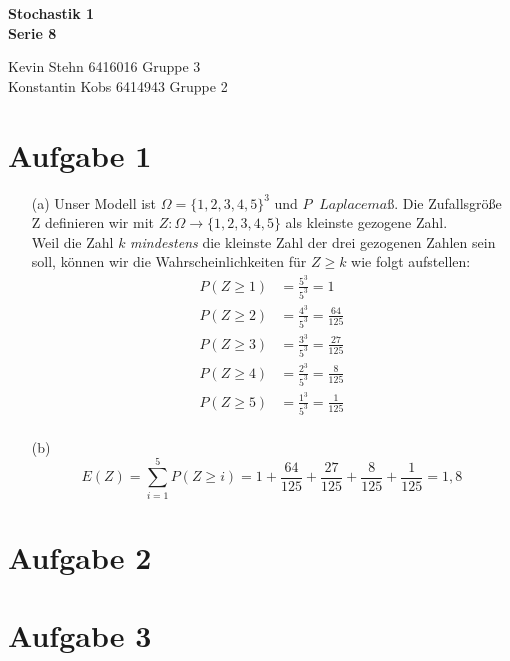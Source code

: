 \documentclass[10pt,a4paper]{article}
\newcommand{\ent}{\mathop{\widehat{=}}}
\begin{document}
\begin{center}
\textbf{Stochastik 1 \\ Serie 8 \\}
\end{center}

\begin{flushright}
Kevin Stehn 6416016 Gruppe 3 \\
Konstantin Kobs 6414943 Gruppe 2
\end{flushright}

\section*{Aufgabe 1}
\begin{itemize}
\item[(a)] Unser Modell ist $\Omega = \{1,2,3,4,5\}^3$ und $P \ent Laplacemaß$. Die Zufallsgröße Z definieren wir mit $Z: \Omega \rightarrow \{1,2,3,4,5\}$ als kleinste gezogene Zahl.\\
Weil die Zahl $k$ \textit{mindestens} die kleinste Zahl der drei gezogenen Zahlen sein soll, können wir die Wahrscheinlichkeiten für $Z \geq k$ wie folgt aufstellen:
\begin{align*}
P(Z \geq 1) &= \frac{5^3}{5^3} = 1\\
P(Z \geq 2) &= \frac{4^3}{5^3} = \frac{64}{125}\\
P(Z \geq 3) &= \frac{3^3}{5^3} = \frac{27}{125}\\
P(Z \geq 4) &= \frac{2^3}{5^3} = \frac{8}{125}\\
P(Z \geq 5) &= \frac{1^3}{5^3} = \frac{1}{125}\\
\end{align*}

\item[(b)] 
$$E(Z) = \sum_{i=1}^5 P(Z \geq i) = 1 + \frac{64}{125} + \frac{27}{125}+ \frac{8}{125} + \frac{1}{125} = 1,8$$
\end{itemize}

\section*{Aufgabe 2}


\section*{Aufgabe 3}
\end{document}
